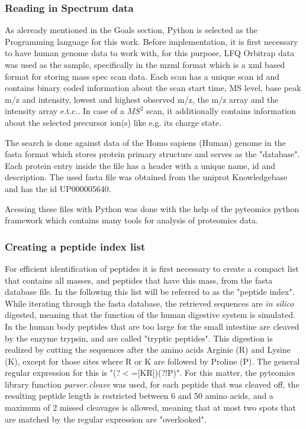 \documentclass[11pt]{article}
\begin{document}
\subsubsection{Reading in Spectrum data}

As aleready mentioned in the Goals section, Python is selected as the Programming language for this work. Before implementation, it is first necessary to have human genome data to work with, for this purpose, LFQ Orbitrap data was used as the sample, specifically in the mzml format which is a xml based format for storing mass spec scan data. Each scan has a unique scan id and contains binary coded information about the scan start time, MS level, base peak m/z and intensity, lowest and highest observed m/z, the m/z array and the intensity array e.t.c.. In case of a \(MS^2\) scan, it additionally contains information about the selected precursor ion(s) like e.g. its charge state.

The search is done against data of the Homo sapiens (Human) genome in the fasta format which stores protein primary structure and serves as the "database". Each protein entry inside the file has a header with a unique name, id and description. The used fasta file was obtained from the uniprot Knowledgebase and has the id UP000005640.

Acessing these files with Python was done with the help of the pyteomics python framework \cite{pyteomics, pyteomics-five-years} which contains many tools for analysis of proteomics data. 

\subsubsection{Creating a peptide index list}
For efficient identification of peptides it is first necessary to create a compact list that contains all masses, and peptides that have this mass, from the fasta database file. In the following this list will be referred to as the "peptide index". While iterating through the fasta database, the retrieved sequences are \textit{in silico} digested, meaning that the function of the human digestive system is simulated. In the human body peptides that are too large for the small intestine are cleaved by the enzyme trypsin, and are called "tryptic peptides". This digestion is realized by cutting the sequences after the amino acids Arginie (R) and Lysine (K), except for those sites where R or K are followed by Proline (P). The general regular expression for this is "(?$<$=[KR])(?!P)". For this matter, the pyteomics library function \textit{parser.cleave} was used, for each peptide that was cleaved off, the resulting peptide length is restricted between 6 and 50 amino acids, and a maximum of 2 missed cleavages is allowed, meaning that at most two spots that are matched by the regular expression are "overlooked". 
\end{document}
